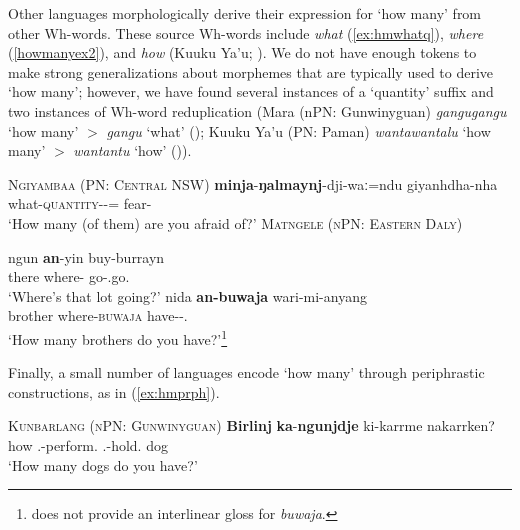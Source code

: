 \documentclass[12pt,egregdoesnotlikesansseriftitles]{scrartcl}
\begin{document}
 
 Other languages morphologically derive their expression for `how many' from other Wh-words. These source Wh-words include \textit{what} (\ref{ex:hmwhatq}), \textit{where} (\ref{howmanyex2}), and \textit{how} (Kuuku Ya'u; \citealt{thompson88}). We do not have enough tokens to make strong generalizations about morphemes that are typically used to derive `how many'; however, we have found several instances of a `quantity' suffix and two instances of Wh-word reduplication (Mara (nPN: Gunwinyguan) \textit{gangugangu} `how many' $>$ \textit{gangu} `what' (\citealt[174]{heath81}); Kuuku Ya'u (PN: Paman) \textit{wantawantalu} `how many' $>$ \textit{wantantu} `how' (\citealt[91]{thompson88})).

  

\begin{exe}
  \ex\label{ex:hmwhatq}\textsc{Ngiyambaa (PN: Central NSW)}\hfill {}
  \gll \textbf{minja}-\textbf{ŋalmaynj}-dji-waː=ndu giyanhdha-nha\\
  what-\textsc{quantity}-\Circ-\Excl=\Second\Nom{} fear-\Prs\\
  \glt `How many (of them) are you afraid of?'
  \ex \label{howmanyex2} \textsc{Matngele (nPN: Eastern Daly)}\hfill {}
  \begin{xlist}
    \ex \gll ngun \textbf{an}-yin buy-burrayn\\
    there where-\All{} go-\Third\Aug\Sbj.go.\Impv\\
    \glt `Where's that lot going?' %
    \ex \gll nida \textbf{an-buwaja} wari-mi-anyang\\
    brother where-\textsc{buwaja} have-\Impv-\Second\Min\Sbj.\Prs\\
    \glt `How many brothers do you have?'\footnote{\cite{zandvoort99} does not provide an interlinear gloss for \textit{buwaja}.} %
  \end{xlist}
  \end{exe}
  
 Finally, a small number of languages encode `how many'  through periphrastic constructions, as in (\ref{ex:hmprph}).
  
  \begin{exe}
  \ex\label{ex:hmprph}\textsc{Kunbarlang (nPN: Gunwinyguan)}\hfill \citep{ikthesis}
  \gll \textbf{Birlinj} \textbf{ka}-\textbf{ngunjdje} ki-karrme nakarrken?\\
  how \Tsg.\Nfut-perform.\Np{} \Ssg.\Nfut-hold.\Np{} dog\\
  \glt `How many dogs do you have?' %
\end{exe}
\end{document}

